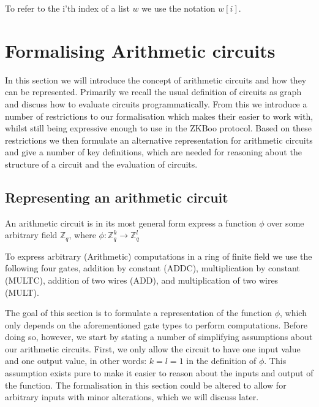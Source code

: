To refer to the i'th index of a list $w$ we use the notation $w[i]$.

\section{Formalising Arithmetic circuits}
\label{sec:arith_circuits}
In this section we will introduce the concept of arithmetic circuits and how they
can be represented. Primarily we recall the usual definition of circuits as
graph and discuss how to evaluate circuits programmatically. From this we
introduce a number of restrictions to our formalisation which makes their easier
to work with, whilst still being expressive enough to use in the ZKBoo protocol.
Based on these restrictions we then formulate an alternative representation for
arithmetic circuits and give a number of key definitions, which are needed for
reasoning about the structure of a circuit and the evaluation of circuits.

\subsection{Representing an arithmetic circuit}
\label{subsec:arith-representation}
An arithmetic circuit is in its most general form express a function $\phi$ over some
arbitrary field $\mathbb{Z}_{q}$, where $\phi : \mathbb{Z}_{q}^{k} \rightarrow \mathbb{Z}_{q}^{l}$

To express arbitrary (Arithmetic) computations in a ring of finite field we
use the following four gates, addition by constant (ADDC), multiplication by constant
(MULTC), addition of two wires (ADD), and multiplication of two wires (MULT).

The goal of this section is to formulate a representation of the function
$\phi$, which only depends on the aforementioned gate types to perform
computations. Before doing so, however, we start by stating a number of
simplifying assumptions about our arithmetic circuits. First, we only allow the
circuit to have one input value and one output value, in other words:
$k = l = 1$ in the definition of $\phi$.
This assumption exists pure to make it easier to reason about the inputs and
output of the function. The formalisation in this section could be altered to
allow for arbitrary inputs with minor alterations, which we will discuss later.

